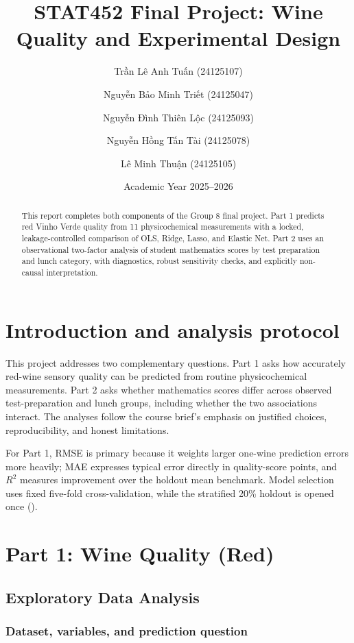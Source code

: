 \documentclass[
  10pt,
]{article}
\title{STAT452 Final Project: Wine Quality and Experimental Design}
\author{Trần Lê Anh Tuấn (24125107) \and Nguyễn Bảo Minh Triết
(24125047) \and Nguyễn Đình Thiên Lộc (24125093) \and Nguyễn Hồng Tấn
Tài (24125078) \and Lê Minh Thuận (24125105)}
\date{Academic Year 2025--2026}
\begin{document}
\maketitle

{
\setcounter{tocdepth}{2}
\tableofcontents
}
\begin{abstract}
This report completes both components of the Group 8 final project. Part 1
predicts red Vinho Verde quality from 11 physicochemical measurements with a
locked, leakage-controlled comparison of OLS, Ridge, Lasso, and Elastic Net.
Part 2 uses an observational two-factor analysis of student mathematics scores
by test preparation and lunch category, with diagnostics, robust sensitivity
checks, and explicitly non-causal interpretation.
\end{abstract}

\section{Introduction and analysis
protocol}\label{introduction-and-analysis-protocol}

This project addresses two complementary questions. Part 1 asks how
accurately red-wine sensory quality can be predicted from routine
physicochemical measurements. Part 2 asks whether mathematics scores
differ across observed test-preparation and lunch groups, including
whether the two associations interact. The analyses follow the course
brief's emphasis on justified choices, reproducibility, and honest
limitations.

For Part 1, RMSE is primary because it weights larger one-wine prediction
errors more heavily; MAE expresses typical error directly in quality-score points,
and \(R^2\) measures improvement over the holdout mean benchmark. Model
selection uses fixed five-fold cross-validation, while the stratified
20\% holdout is opened once ().

\section{Part 1: Wine Quality (Red)}\label{part-1-wine-quality-red}

\subsection{Exploratory Data Analysis}\label{exploratory-data-analysis}

\subsubsection{Dataset, variables, and prediction
question}\label{dataset-variables-and-prediction-question}
\end{document}
